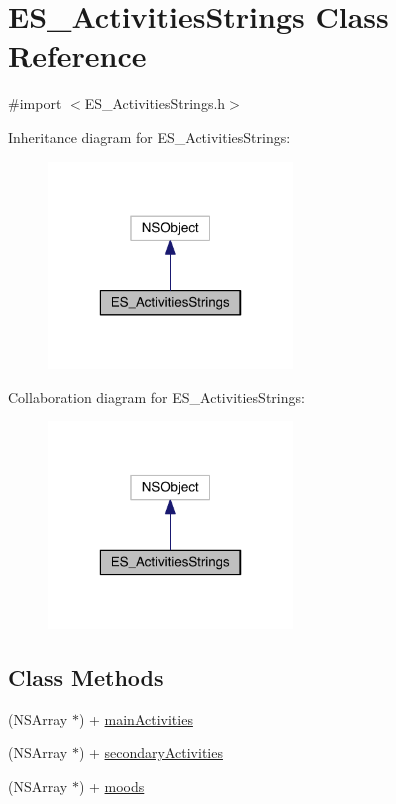\hypertarget{interface_e_s___activities_strings}{\section{E\+S\+\_\+\+Activities\+Strings Class Reference}
\label{interface_e_s___activities_strings}
}


{\ttfamily \#import $<$E\+S\+\_\+\+Activities\+Strings.\+h$>$}



Inheritance diagram for E\+S\+\_\+\+Activities\+Strings\+:\nopagebreak
\begin{figure}[H]
\begin{center}
\leavevmode
\includegraphics[width=184pt]{dd/de7/interface_e_s___activities_strings__inherit__graph}
\end{center}
\end{figure}


Collaboration diagram for E\+S\+\_\+\+Activities\+Strings\+:\nopagebreak
\begin{figure}[H]
\begin{center}
\leavevmode
\includegraphics[width=184pt]{da/de2/interface_e_s___activities_strings__coll__graph}
\end{center}
\end{figure}
\subsection*{Class Methods}
\begin{DoxyCompactItemize}
\item 
(N\+S\+Array $\ast$) + \hyperlink{interface_e_s___activities_strings_af9ad4eca9ea642e71f532817d561443e}{main\+Activities}
\item 
(N\+S\+Array $\ast$) + \hyperlink{interface_e_s___activities_strings_adc4598d5c1df8112c74762fe60b6bac7}{secondary\+Activities}
\item 
(N\+S\+Array $\ast$) + \hyperlink{interface_e_s___activities_strings_ac65375e8c0a5fd28c9d280e7963abb94}{moods}
\end{DoxyCompactItemize}



